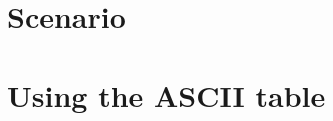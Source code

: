 





\makeatletter
\let\orig@lstnumber=\thelstnumber

\newcommand\lstsetnumber[1]{\gdef\thelstnumber{#1}}
\newcommand\lstresetnumber{\global\let\thelstnumber=\orig@lstnumber}
\makeatother

\renewcommand{\labnumber}{\keyboardpointerlabnumber}
\renewcommand{\labname}{Bit and Pointer Manipulation Lab}
\renewcommand{\shortlabname}{keyboardlab}
\renewcommand{\collaborationrules}{\keyboardpointerlabcollaboration}
\renewcommand{\duedate}{\keyboardpointerlabdue}

\newcommand{\tab}{\ensuremath{\longrightarrow}}
\newcommand{\nl}{\ensuremath{\hookleftarrow}}

\pagelayout

\labidentifier



\softwareengineeringfrontmatter

\section*{Scenario}                                             \FirstDayOnTheJob

\section{Using the ASCII table}\label{sec:ascii}                


